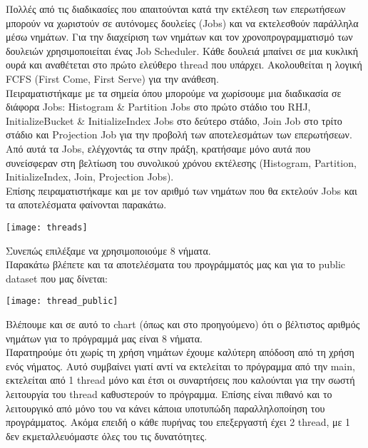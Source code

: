 \documentclass[12pt, a4paper]{article}
\begin{document}
Πολλές από τις διαδικασίες που απαιτούνται κατά την εκτέλεση των επερωτήσεων μπορούν να χωριστούν σε αυτόνομες δουλείες (Jobs) και να εκτελεσθούν παράλληλα μέσω νημάτων. Για την διαχείριση των νημάτων και τον χρονοπρογραμματισμό των δουλειών χρησιμοποιείται ένας Job Scheduler. Κάθε δουλειά μπαίνει σε μια κυκλική ουρά και αναθέτεται στο πρώτο ελεύθερο thread που υπάρχει. Ακολουθείται η λογική FCFS (First Come, First Serve) για την ανάθεση.\\ 

Πειραματιστήκαμε με τα σημεία όπου μπορούμε να χωρίσουμε μια διαδικασία σε διάφορα Jobs: Histogram \& Partition Jobs στο πρώτο στάδιο του RHJ, InitializeBucket \& InitializeIndex Jobs στο δεύτερο στάδιο, Join Job στο τρίτο στάδιο και Projection Job για την προβολή των αποτελεσμάτων των επερωτήσεων. Από αυτά τα Jobs, ελέγχοντάς τα στην πράξη, κρατήσαμε μόνο αυτά που συνείσφεραν στη βελτίωση του συνολικού χρόνου εκτέλεσης (Histogram, Partition, InitializeIndex, Join, Projection Jobs).\\ 

Επίσης πειραματιστήκαμε και με τον αριθμό των νημάτων που θα εκτελούν Jobs και τα αποτελέσματα φαίνονται παρακάτω.

\begin{center}
\texttt{[image: threads]} 
\end{center}

Συνεπώς επιλέξαμε να χρησιμοποιούμε 8 νήματα.\\

Παρακάτω βλέπετε και τα αποτελέσματα του προγράμματός μας και για το public dataset που μας δίνεται:

\begin{center}
\texttt{[image: thread\_public]} 
\end{center}

Βλέπουμε και σε αυτό το chart (όπως και στο προηγούμενο) ότι ο βέλτιστος αριθμός νημάτων για το πρόγραμμά μας είναι 8 νήματα. \\

Παρατηρούμε ότι χωρίς τη χρήση νημάτων έχουμε καλύτερη απόδοση από τη χρήση ενός νήματος. Αυτό συμβαίνει γιατί αντί να εκτελείται το πρόγραμμα από την main, εκτελείται από 1 thread μόνο και έτσι οι συναρτήσεις που καλούνται για την σωστή λειτουργία του thread καθυστερούν το πρόγραμμα. Επίσης είναι πιθανό και το λειτουργικό από μόνο του να κάνει κάποια υποτυπώδη παραλληλοποίηση του προγράμματος. Ακόμα επειδή ο κάθε πυρήνας του επεξεργαστή έχει 2 thread, με 1 δεν εκμεταλλευόμαστε όλες του τις δυνατότητες. 
\end{document}
